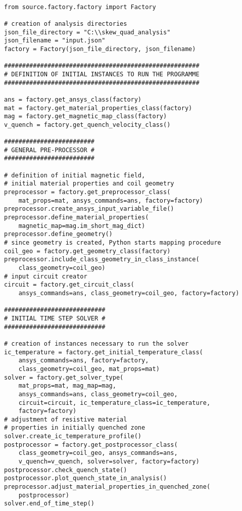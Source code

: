 
\begin{verbatim}

from source.factory.factory import Factory

# creation of analysis directories
json_file_directory = "C:\\skew_quad_analysis"
json_filename = "input.json"
factory = Factory(json_file_directory, json_filename)

######################################################
# DEFINITION OF INITIAL INSTANCES TO RUN THE PROGRAMME
######################################################

ans = factory.get_ansys_class(factory)
mat = factory.get_material_properties_class(factory)
mag = factory.get_magnetic_map_class(factory)
v_quench = factory.get_quench_velocity_class()

#########################
# GENERAL PRE-PROCESSOR #
#########################

# definition of initial magnetic field, 
# initial material properties and coil geometry
preprocessor = factory.get_preprocessor_class(
    mat_props=mat, ansys_commands=ans, factory=factory)
preprocessor.create_ansys_input_variable_file()
preprocessor.define_material_properties(
    magnetic_map=mag.im_short_mag_dict)
preprocessor.define_geometry()
# since geometry is created, Python starts mapping procedure
coil_geo = factory.get_geometry_class(factory)
preprocessor.include_class_geometry_in_class_instance(
    class_geometry=coil_geo)
# input circuit creator
circuit = factory.get_circuit_class(
    ansys_commands=ans, class_geometry=coil_geo, factory=factory)

############################
# INITIAL TIME STEP SOLVER #
############################

# creation of instances necessary to run the solver
ic_temperature = factory.get_initial_temperature_class(
    ansys_commands=ans, factory=factory,
    class_geometry=coil_geo, mat_props=mat)
solver = factory.get_solver_type(
    mat_props=mat, mag_map=mag, 
    ansys_commands=ans, class_geometry=coil_geo,
    circuit=circuit, ic_temperature_class=ic_temperature, 
    factory=factory)
# adjustment of resistive material 
# properties in initially quenched zone
solver.create_ic_temperature_profile()
postprocessor = factory.get_postprocessor_class(
    class_geometry=coil_geo, ansys_commands=ans,
    v_quench=v_quench, solver=solver, factory=factory)
postprocessor.check_quench_state()
postprocessor.plot_quench_state_in_analysis()
preprocessor.adjust_material_properties_in_quenched_zone(
    postprocessor)
solver.end_of_time_step()


\end{verbatim}
